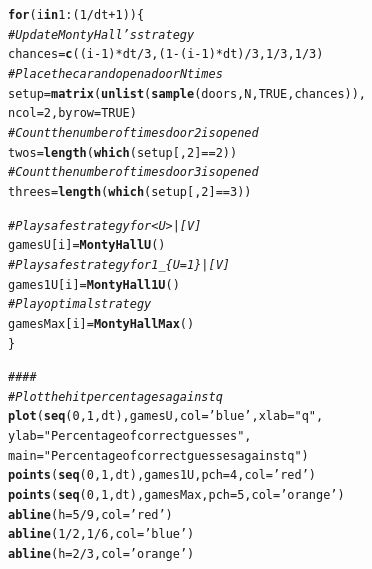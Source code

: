 \documentclass[twoside,a4paper]{article}
\makeatletter
\theoremstyle{plain}
\theoremstyle{definition}
\theoremstyle{remark}
\numberwithin{equation}{section}
\newcommand{\hlnum}[1]{\textcolor[rgb]{0.686,0.059,0.569}{#1}}%
\newcommand{\hlstr}[1]{\textcolor[rgb]{0.192,0.494,0.8}{#1}}%
\newcommand{\hlcom}[1]{\textcolor[rgb]{0.678,0.584,0.686}{\textit{#1}}}%
\newcommand{\hlopt}[1]{\textcolor[rgb]{0,0,0}{#1}}%
\newcommand{\hlstd}[1]{\textcolor[rgb]{0.345,0.345,0.345}{#1}}%
\newcommand{\hlkwa}[1]{\textcolor[rgb]{0.161,0.373,0.58}{\textbf{#1}}}%
\newcommand{\hlkwb}[1]{\textcolor[rgb]{0.69,0.353,0.396}{#1}}%
\newcommand{\hlkwc}[1]{\textcolor[rgb]{0.333,0.667,0.333}{#1}}%
\newcommand{\hlkwd}[1]{\textcolor[rgb]{0.737,0.353,0.396}{\textbf{#1}}}%
\newenvironment{kframe}{%
 \def\at@end@of@kframe{}%
 \ifinner\ifhmode%
  \def\at@end@of@kframe{\end{minipage}}%
  \begin{minipage}{\columnwidth}%
 \fi\fi%
 \def\FrameCommand##1{\hskip\@totalleftmargin \hskip-\fboxsep
 \colorbox{shadecolor}{##1}\hskip-\fboxsep
     \hskip-\linewidth \hskip-\@totalleftmargin \hskip\columnwidth}%
 \MakeFramed {\advance\hsize-\width
   \@totalleftmargin\z@ \linewidth\hsize
   \@setminipage}}%
 {\par\unskip\endMakeFramed%
 \at@end@of@kframe}
\newenvironment{knitrout}{}{} %
\DeclareMathOperator{\1}{\mathbbm{1}}
\makeatother
\begin{document}
\begin{knitrout}
\begin{kframe}
\begin{alltt}
\hlkwa{for} \hlstd{(i} \hlkwa{in} \hlnum{1}\hlopt{:}\hlstd{(}\hlnum{1}\hlopt{/}\hlstd{dt}\hlopt{+}\hlnum{1}\hlstd{)) \{}
  \hlcom{# Update Monty Hall's strategy}
  \hlstd{chances} \hlkwb{=} \hlkwd{c}\hlstd{((i}\hlopt{-}\hlnum{1}\hlstd{)}\hlopt{*}\hlstd{dt}\hlopt{/}\hlnum{3}\hlstd{, (}\hlnum{1}\hlopt{-}\hlstd{(i}\hlopt{-}\hlnum{1}\hlstd{)}\hlopt{*}\hlstd{dt)}\hlopt{/}\hlnum{3}\hlstd{,} \hlnum{1}\hlopt{/}\hlnum{3}\hlstd{,} \hlnum{1}\hlopt{/}\hlnum{3}\hlstd{)}
  \hlcom{# Place the car and open a door N times}
  \hlstd{setup} \hlkwb{=} \hlkwd{matrix}\hlstd{(}\hlkwd{unlist}\hlstd{(}\hlkwd{sample}\hlstd{(doors, N,} \hlnum{TRUE}\hlstd{, chances)),}
                 \hlkwc{ncol} \hlstd{=} \hlnum{2}\hlstd{,} \hlkwc{byrow} \hlstd{=} \hlnum{TRUE}\hlstd{)}
  \hlcom{# Count the number of times door 2 is opened}
  \hlstd{twos} \hlkwb{=} \hlkwd{length}\hlstd{(}\hlkwd{which}\hlstd{(setup[,}\hlnum{2}\hlstd{]} \hlopt{==} \hlnum{2}\hlstd{))}
  \hlcom{# Count the number of times door 3 is opened}
  \hlstd{threes} \hlkwb{=} \hlkwd{length}\hlstd{(}\hlkwd{which}\hlstd{(setup[,}\hlnum{2}\hlstd{]} \hlopt{==} \hlnum{3}\hlstd{))}

  \hlcom{# Play safe strategy for <U>|[V]}
  \hlstd{gamesU[i]} \hlkwb{=} \hlkwd{MontyHallU}\hlstd{()}
  \hlcom{# Play safe strategy for 1_\{U=1\}|[V]}
  \hlstd{games1U[i]} \hlkwb{=} \hlkwd{MontyHall1U}\hlstd{()}
  \hlcom{# Play optimal strategy}
  \hlstd{gamesMax[i]} \hlkwb{=} \hlkwd{MontyHallMax}\hlstd{()}
\hlstd{\}}

\hlcom{####}
\hlcom{# Plot the hit percentages against q}
\hlkwd{plot}\hlstd{(}\hlkwd{seq}\hlstd{(}\hlnum{0}\hlstd{,}\hlnum{1}\hlstd{,dt), gamesU,} \hlkwc{col}\hlstd{=}\hlstr{'blue'}\hlstd{,} \hlkwc{xlab}\hlstd{=}\hlstr{"q"}\hlstd{,}
     \hlkwc{ylab}\hlstd{=}\hlstr{"Percentage of correct guesses"}\hlstd{,}
     \hlkwc{main}\hlstd{=}\hlstr{"Percentage of correct guesses against q"}\hlstd{)}
\hlkwd{points}\hlstd{(}\hlkwd{seq}\hlstd{(}\hlnum{0}\hlstd{,}\hlnum{1}\hlstd{,dt), games1U,} \hlkwc{pch}\hlstd{=}\hlnum{4}\hlstd{,} \hlkwc{col}\hlstd{=}\hlstr{'red'}\hlstd{)}
\hlkwd{points}\hlstd{(}\hlkwd{seq}\hlstd{(}\hlnum{0}\hlstd{,}\hlnum{1}\hlstd{,dt), gamesMax,} \hlkwc{pch}\hlstd{=}\hlnum{5}\hlstd{,} \hlkwc{col}\hlstd{=}\hlstr{'orange'}\hlstd{)}
\hlkwd{abline}\hlstd{(}\hlkwc{h}\hlstd{=}\hlnum{5}\hlopt{/}\hlnum{9}\hlstd{,} \hlkwc{col}\hlstd{=}\hlstr{'red'}\hlstd{)}
\hlkwd{abline}\hlstd{(}\hlnum{1}\hlopt{/}\hlnum{2}\hlstd{,}\hlnum{1}\hlopt{/}\hlnum{6}\hlstd{,} \hlkwc{col}\hlstd{=}\hlstr{'blue'}\hlstd{)}
\hlkwd{abline}\hlstd{(}\hlkwc{h}\hlstd{=}\hlnum{2}\hlopt{/}\hlnum{3}\hlstd{,} \hlkwc{col}\hlstd{=}\hlstr{'orange'}\hlstd{)}
\end{alltt}
\end{kframe}
\end{knitrout}
\end{document}
